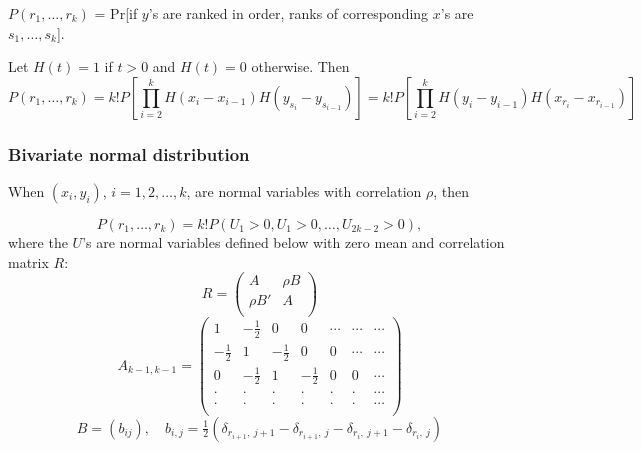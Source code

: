 $P(r_1,\ldots,r_k)$ = Pr[if $y$'s are ranked in order, ranks of corresponding $x$'s are $s_1,\ldots,s_k$]. 

Let $H(t) = 1$ if $t>0$ and $H(t)=0$ otherwise. Then
\begin{equation} 
	P(r_1,\ldots,r_k) = k! P \left[ \prod_{i=2}^k H(x_i - x_{i-1})  H(y_{s_i} - y_{s_{i-1}}) \right] = k! P \left[ \prod_{i=2}^k H(y_i - y_{i-1})  H(x_{r_i} - x_{r_{i-1}}) \right]
\end{equation}




\subsubsection{Bivariate normal distribution}
\label{KendallBivariateNormalDistribution}
When $(x_i,y_i)$, $i=1,2,\ldots,k$, are normal variables with correlation $\rho$, then 

\begin{equation} 
	P(r_1,\ldots,r_k) = k! P(U_1 > 0, U_1 > 0,\ldots, U_{2k-2} > 0), 
\end{equation} 
where the $U$'s are normal variables defined below with zero mean and correlation matrix $R$:
\begin{equation} 
	R =  \begin{pmatrix}
		A & \rho B \\
		\rho B' & A \\
	\end{pmatrix}
\end{equation} 
\begin{equation} 
	A_{k-1,k-1} =
	\begin{pmatrix}
		1             & -\tfrac{1}{2} & 0             & 0             & \cdots & \cdots & \cdots \\
		-\tfrac{1}{2} & 1             & -\tfrac{1}{2} & 0             & 0      & \cdots & \cdots \\
		0             & -\tfrac{1}{2} & 1             & -\tfrac{1}{2} & 0      & 0      & \cdots \\
		\cdot         & \cdot         & \cdot         & \cdot         & \cdot  & \cdot  & \cdots \\
		\cdot         & \cdot         & \cdot         & \cdot         & \cdot  & \cdot  & \cdots \\
	\end{pmatrix}
\end{equation} 
\begin{equation} 
	B=(b_{ij}), \quad b_{i,j} = \tfrac{1}{2} \left(\delta_{r_{i+1},\:j+1} - \delta_{r_{i+1},\:j} - \delta_{r_{i},\:j+1} - \delta_{r_{i},\:j}  \right) 
\end{equation} 

